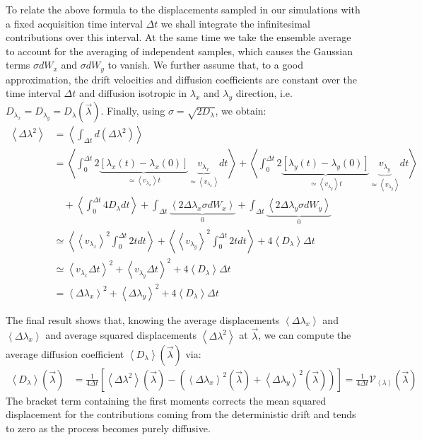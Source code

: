 \documentclass[10pt]{article}
\newcommand{\vekA}[1]{\vec{#1}}
\newcommand{\avg}[1]{\left\langle #1\right\rangle}
\newcommand{\nn}{\nonumber}
\begin{document}
\pagebreak
To relate the above formula to the displacements sampled in our simulations with a fixed acquisition time interval $\Delta t$
we shall integrate the infinitesimal contributions over this interval.
At the same time we take the ensemble average to account for the averaging of independent samples, which causes the
Gaussian terms $\sigma dW_x$ and $\sigma dW_y$ to vanish.
We further assume that, to a good approximation, the drift velocities and diffusion coefficients are constant 
over the time interval $\Delta t$ and diffusion isotropic in $\lambda_x$ and $\lambda_y$ direction,
i.e. $D_{\lambda_x}=D_{\lambda_y}=D_\lambda(\vekA{\lambda})$.
Finally, using $\sigma = \sqrt{2 D_\lambda}$, we obtain:
\begin{align}
 \avg{\Delta\lambda^2} &= \avg{\int_{\Delta t} d(\Delta\lambda^2) } 	\nn\\
		       &= \avg{\int_{0}^{\Delta t} 2 \underbrace{\left[ \lambda_x(t) - \lambda_{x}(0) \right]}_{\simeq\avg{v_{\lambda_x}}t} \underbrace{v_{\lambda_x}}_{\simeq \avg{v_{\lambda_x}}} dt}
			+ \avg{\int_{0}^{\Delta t} 2 \underbrace{\left[ \lambda_y(t) - \lambda_{y}(0) \right]}_{\simeq\avg{v_{\lambda_y}}t} \underbrace{v_{\lambda_y}}_{\simeq \avg{v_{\lambda_y}}} dt} \nn\\
		       &\quad + \avg{\int_0^{\Delta t} 4D_\lambda dt} 
			      + \int_{\Delta t} \underbrace{\avg{2\Delta\lambda_x\sigma dW_x}}_{0} + \int_{\Delta t} \underbrace{\avg{2\Delta\lambda_y\sigma dW_y } }_{0} \nn\\
		       &\simeq \avg{ \avg{v_{\lambda_x}}^2 \int_{0}^{\Delta t} 2t dt} + \avg{ \avg{v_{\lambda_y}}^2 \int_{0}^{\Delta t} 2t dt}
			  + 4 \avg{D_\lambda} \Delta t										\nn\\
		       &\simeq \avg{v_{\lambda_x}\Delta t}^2 + \avg{v_{\lambda_y}\Delta t}^2 + 4 \avg{D_\lambda} \Delta t	\nn\\
		       &= \avg{\Delta{\lambda_x}}^2 + \avg{\Delta{\lambda_y}}^2 + 4 \avg{D_\lambda} \Delta t
\end{align}

The final result shows that, knowing the average displacements $\avg{\Delta{\lambda_x}}$ and $\avg{\Delta{\lambda_x}}$ and average
squared displacements $\avg{\Delta\lambda^2}$ at $\vekA{\lambda}$, we can compute
the average diffusion coefficient $\avg{D_\lambda}(\vekA{\lambda})$ via:
\begin{align}
 \avg{D_\lambda}(\vekA{\lambda}) &= \frac{1}{4\Delta t} \left[ \avg{\Delta\lambda^2}(\vekA{\lambda}) - \left( \avg{\Delta{\lambda_x}}^2(\vekA{\lambda}) + \avg{\Delta{\lambda_y}}^2(\vekA{\lambda}) \right)\right]
				 = \frac{1}{4\Delta t} \mathcal{V}_{\avg{\lambda}}(\vekA{\lambda})
\end{align}
The bracket term containing the first moments corrects the mean squared displacement for the contributions coming from the deterministic drift
and tends to zero as the process becomes purely diffusive.
\end{document}
